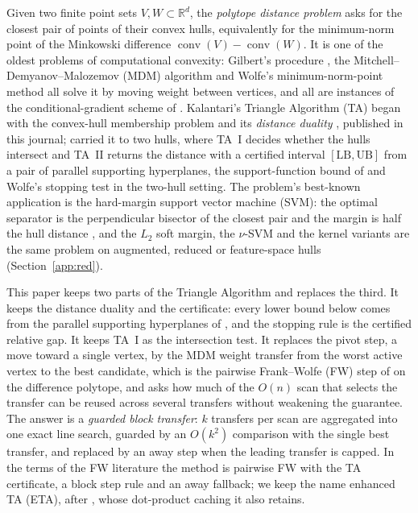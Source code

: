 \documentclass[pdflatex,sn-apa]{sn-jnl}%
\theoremstyle{thmstyleone}
\theoremstyle{thmstyletwo}
\newcommand{\conv}{\operatorname{conv}}
\newcommand{\R}{\mathbb{R}}
\newcommand{\UB}{\mathrm{UB}}
\newcommand{\LB}{\mathrm{LB}}
\begin{document}
Given two finite point sets $V,W\subset\R^d$, the \emph{polytope
distance problem} asks for the closest pair of points of their convex
hulls, equivalently for the minimum-norm point of the Minkowski
difference $\conv(V)-\conv(W)$. It is one of the oldest problems of
computational convexity: Gilbert's procedure \citep{gilbert1966}, the
Mitchell--Demyanov--Malozemov (MDM) algorithm \citep{mdm1974} and
Wolfe's minimum-norm-point method \citep{wolfe1976} all solve it by
moving weight between vertices, and all are instances of the
conditional-gradient scheme of \citet{frankwolfe1956}. Kalantari's
Triangle Algorithm (TA) began with the convex-hull membership problem
and its \emph{distance duality} \citep{kalantari2015}, published in
this journal; \citet{kalantari2019} carried it to two hulls, where
TA~I decides whether the hulls intersect and TA~II returns the
distance with a certified interval $[\LB,\UB]$ from a pair of parallel
supporting hyperplanes, the support-function bound of
\citet{gilbert1966} and Wolfe's stopping test in the two-hull setting.
The problem's best-known
application is the hard-margin support vector machine (SVM): the
optimal separator is the perpendicular bisector of the closest pair and
the margin is half the hull distance \citep{bennett2000duality,
keerthi2000}, and the $L_2$ soft margin, the $\nu$-SVM and the kernel
variants are the same problem on augmented, reduced or feature-space
hulls (Section~\ref{app:red}).

This paper keeps two parts of the Triangle Algorithm and replaces the
third. It keeps the distance duality and the certificate: every lower
bound below comes from the parallel supporting hyperplanes of
\citet{kalantari2019}, and the stopping rule is the certified relative
gap. It keeps TA~I as the intersection test. It replaces the pivot
step, a move toward a single vertex, by the MDM weight transfer from
the worst active vertex to the best candidate, which is the pairwise
Frank--Wolfe (FW) step of \citet{lj2015} on the difference polytope,
and asks how much of the $O(n)$ scan that selects the transfer can be
reused across several transfers without weakening the guarantee. The
answer is a \emph{guarded block transfer}: $k$ transfers per scan are
aggregated into one exact line search, guarded by an $O(k^2)$
comparison with the single best transfer, and replaced by an away step
when the leading transfer is capped. In the terms of the
FW literature the method is pairwise FW with the TA certificate, a
block step rule and an away fallback; we keep the name enhanced TA
(ETA), after \citet{gupta2026}, whose dot-product caching it also
retains.
\end{document}
